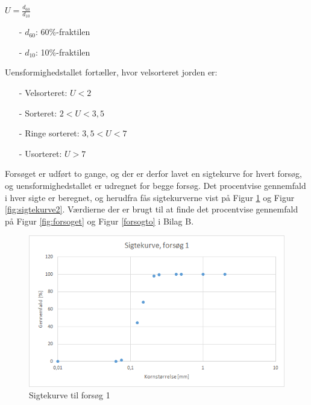 \begin{center}
	$U = \frac{d_{60}}{d_{10}}$
\end{center}

\begin{itemize}
	\item[-] $d_{60}$: 60\%-fraktilen
	\item[-] $d_{10}$: 10\%-fraktilen
\end{itemize}

Uensformighedstallet fortæller, hvor velsorteret jorden er:

\begin{itemize}
	\item[-] Velsorteret: $U < 2$
	\item[-] Sorteret: $2 < U < 3,\!5$
	\item[-] Ringe sorteret: $3,\!5 < U < 7$
	\item[-] Usorteret: $U > 7$
\end{itemize}

Forsøget er udført to gange, og der er derfor lavet en sigtekurve for hvert forsøg, og uensformighedstallet er udregnet for begge forsøg. 
\newline \indent{     }  Det procentvise gennemfald i hver sigte er beregnet, og herudfra fås sigtekurverne vist på Figur \ref{fig:sigtekurve1} og Figur \ref{fig:sigtekurve2}. Værdierne der er brugt til at finde det procentvise gennemfald på Figur \ref{fig:forsoget} og Figur \ref{forsogto} i Bilag B. 

\begin{figure}[htbp]
		\includegraphics[width=1.0\textwidth]{billeder/sigtekurve1.png}
		\caption{Sigtekurve til forsøg 1}
		\label{fig:sigtekurve1}
\end{figure}

